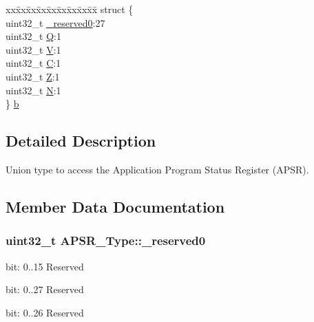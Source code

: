 \begin{DoxyCompactItemize}
\begin{tabbing}
\end{tabbing}\item 
\begin{tabbing}
xx\=xx\=xx\=xx\=xx\=xx\=xx\=xx\=xx\=\kill
struct \{\\
\>uint32\_t \hyperlink{union_a_p_s_r___type_afbce95646fd514c10aa85ec0a33db728}{\_reserved0}:27\\
\>uint32\_t \hyperlink{union_a_p_s_r___type_a22d10913489d24ab08bd83457daa88de}{Q}:1\\
\>uint32\_t \hyperlink{union_a_p_s_r___type_a8004d224aacb78ca37774c35f9156e7e}{V}:1\\
\>uint32\_t \hyperlink{union_a_p_s_r___type_a86e2c5b891ecef1ab55b1edac0da79a6}{C}:1\\
\>uint32\_t \hyperlink{union_a_p_s_r___type_a3b04d58738b66a28ff13f23d8b0ba7e5}{Z}:1\\
\>uint32\_t \hyperlink{union_a_p_s_r___type_a7e7bbba9b00b0bb3283dc07f1abe37e0}{N}:1\\
\} \hyperlink{union_a_p_s_r___type_a08e77fc4c13e2b1c22403ec38baf64a5}{b}\\

\end{tabbing}\end{DoxyCompactItemize}


\subsection{Detailed Description}
Union type to access the Application Program Status Register (A\+P\+SR). 

\subsection{Member Data Documentation}
\subsubsection[{\texorpdfstring{\+\_\+reserved0}{_reserved0}}]{\setlength{\rightskip}{0pt plus 5cm}uint32\+\_\+t A\+P\+S\+R\+\_\+\+Type\+::\+\_\+reserved0}\hypertarget{union_a_p_s_r___type_afbce95646fd514c10aa85ec0a33db728}{}\label{union_a_p_s_r___type_afbce95646fd514c10aa85ec0a33db728}
bit\+: 0..15 Reserved

bit\+: 0..27 Reserved

bit\+: 0..26 Reserved 
